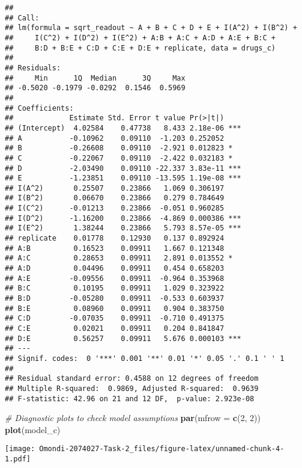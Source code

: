 \documentclass[
]{article}
\newenvironment{Shaded}{\begin{snugshade}}{\end{snugshade}}
\newcommand{\AttributeTok}[1]{\textcolor[rgb]{0.13,0.29,0.53}{#1}}
\newcommand{\CommentTok}[1]{\textcolor[rgb]{0.56,0.35,0.01}{\textit{#1}}}
\newcommand{\DecValTok}[1]{\textcolor[rgb]{0.00,0.00,0.81}{#1}}
\newcommand{\FunctionTok}[1]{\textcolor[rgb]{0.13,0.29,0.53}{\textbf{#1}}}
\newcommand{\NormalTok}[1]{#1}
\begin{document}
\begin{verbatim}
## 
## Call:
## lm(formula = sqrt_readout ~ A + B + C + D + E + I(A^2) + I(B^2) + 
##     I(C^2) + I(D^2) + I(E^2) + A:B + A:C + A:D + A:E + B:C + 
##     B:D + B:E + C:D + C:E + D:E + replicate, data = drugs_c)
## 
## Residuals:
##     Min      1Q  Median      3Q     Max 
## -0.5020 -0.1979 -0.0292  0.1546  0.5969 
## 
## Coefficients:
##             Estimate Std. Error t value Pr(>|t|)    
## (Intercept)  4.02584    0.47738   8.433 2.18e-06 ***
## A           -0.10962    0.09110  -1.203 0.252052    
## B           -0.26608    0.09110  -2.921 0.012823 *  
## C           -0.22067    0.09110  -2.422 0.032183 *  
## D           -2.03490    0.09110 -22.337 3.83e-11 ***
## E           -1.23851    0.09110 -13.595 1.19e-08 ***
## I(A^2)       0.25507    0.23866   1.069 0.306197    
## I(B^2)       0.06670    0.23866   0.279 0.784649    
## I(C^2)      -0.01213    0.23866  -0.051 0.960285    
## I(D^2)      -1.16200    0.23866  -4.869 0.000386 ***
## I(E^2)       1.38244    0.23866   5.793 8.57e-05 ***
## replicate    0.01778    0.12930   0.137 0.892924    
## A:B          0.16523    0.09911   1.667 0.121348    
## A:C          0.28653    0.09911   2.891 0.013552 *  
## A:D          0.04496    0.09911   0.454 0.658203    
## A:E         -0.09556    0.09911  -0.964 0.353968    
## B:C          0.10195    0.09911   1.029 0.323922    
## B:D         -0.05280    0.09911  -0.533 0.603937    
## B:E          0.08960    0.09911   0.904 0.383750    
## C:D         -0.07035    0.09911  -0.710 0.491375    
## C:E          0.02021    0.09911   0.204 0.841847    
## D:E          0.56257    0.09911   5.676 0.000103 ***
## ---
## Signif. codes:  0 '***' 0.001 '**' 0.01 '*' 0.05 '.' 0.1 ' ' 1
## 
## Residual standard error: 0.4588 on 12 degrees of freedom
## Multiple R-squared:  0.9869, Adjusted R-squared:  0.9639 
## F-statistic: 42.96 on 21 and 12 DF,  p-value: 2.923e-08
\end{verbatim}

\begin{Shaded}
\begin{Highlighting}[]
\CommentTok{\# Diagnostic plots to check model assumptions}
\FunctionTok{par}\NormalTok{(}\AttributeTok{mfrow =} \FunctionTok{c}\NormalTok{(}\DecValTok{2}\NormalTok{, }\DecValTok{2}\NormalTok{))}
\FunctionTok{plot}\NormalTok{(model\_c)}
\end{Highlighting}
\end{Shaded}

\texttt{[image: Omondi-2074027-Task-2\_files/figure-latex/unnamed-chunk-4-1.pdf]}
\end{document}
